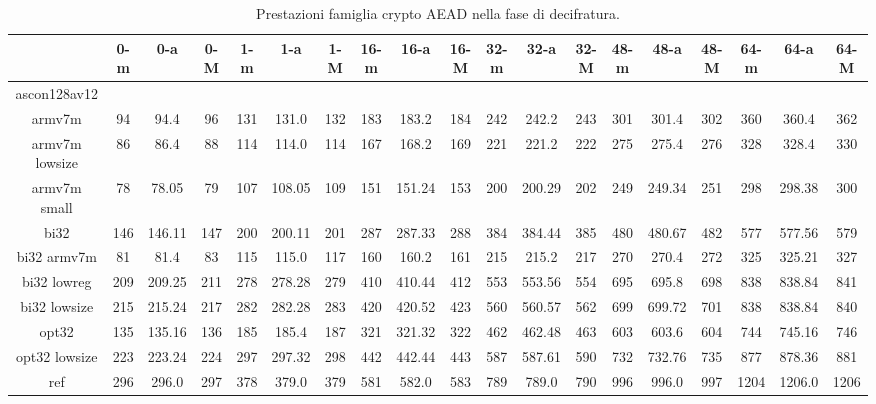 \documentclass[12pt,a4paper,italian]{report}
\begin{document}
\begin{landscape}
    \begin{table}[]
        \caption{Prestazioni famiglia crypto AEAD nella fase di decifratura.}
        \begin{adjustbox}{width=600pt}
            \centering
			\begin{tabular}{|c|c|c|c|c|c|c|c|c|c|c|c|c|c|c|c|c|c|c|}
				\hline
				& 0-m & 0-a & 0-M & 1-m & 1-a & 1-M & 16-m & 16-a & 16-M & 32-m & 32-a & 32-M & 48-m & 48-a & 48-M & 64-m & 64-a & 64-M \\
				\hline
				ascon128av12 & & & & & & & & & & & & & & & & & & \\
				\hline
				armv7m & 94 & 94.4 & 96 & 131 & 131.0 & 132 & 183 & 183.2 & 184 & 242 & 242.2 & 243 & 301 & 301.4 & 302 & 360 & 360.4 & 362 \\
				\hline
				armv7m lowsize & 86 & 86.4 & 88 & 114 & 114.0 & 114 & 167 & 168.2 & 169 & 221 & 221.2 & 222 & 275 & 275.4 & 276 & 328 & 328.4 & 330 \\
				\hline
				armv7m small & 78 & 78.05 & 79 & 107 & 108.05 & 109 & 151 & 151.24 & 153 & 200 & 200.29 & 202 & 249 & 249.34 & 251 & 298 & 298.38 & 300 \\
				\hline
				bi32 & 146 & 146.11 & 147 & 200 & 200.11 & 201 & 287 & 287.33 & 288 & 384 & 384.44 & 385 & 480 & 480.67 & 482 & 577 & 577.56 & 579 \\
				\hline
				bi32 armv7m & 81 & 81.4 & 83 & 115 & 115.0 & 117 & 160 & 160.2 & 161 & 215 & 215.2 & 217 & 270 & 270.4 & 272 & 325 & 325.21 & 327 \\
				\hline
				bi32 lowreg & 209 & 209.25 & 211 & 278 & 278.28 & 279 & 410 & 410.44 & 412 & 553 & 553.56 & 554 & 695 & 695.8 & 698 & 838 & 838.84 & 841 \\
				\hline
				bi32 lowsize & 215 & 215.24 & 217 & 282 & 282.28 & 283 & 420 & 420.52 & 423 & 560 & 560.57 & 562 & 699 & 699.72 & 701 & 838 & 838.84 & 840 \\
				\hline
				opt32 & 135 & 135.16 & 136 & 185 & 185.4 & 187 & 321 & 321.32 & 322 & 462 & 462.48 & 463 & 603 & 603.6 & 604 & 744 & 745.16 & 746 \\
				\hline
				opt32 lowsize & 223 & 223.24 & 224 & 297 & 297.32 & 298 & 442 & 442.44 & 443 & 587 & 587.61 & 590 & 732 & 732.76 & 735 & 877 & 878.36 & 881 \\
				\hline
				ref & 296 & 296.0 & 297 & 378 & 379.0 & 379 & 581 & 582.0 & 583 & 789 & 789.0 & 790 & 996 & 996.0 & 997 & 1204 & 1206.0 & 1206 \\
				\hline

\end{tabular}
\end{adjustbox}
\end{table}
\end{landscape}
\end{document}
